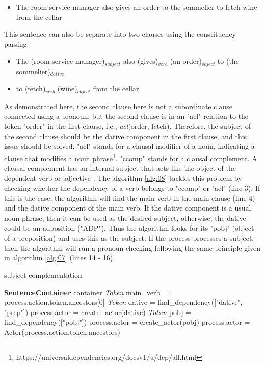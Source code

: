 \begin{itemize}
    \item The room-service manager also gives an order to the sommelier to fetch wine from the cellar
\end{itemize}

This sentence can also be separate into two clauses using the constituency parsing.

\begin{itemize}
    \item The (room-service manager)$_{subject}$ also (gives)$_{verb}$ (an order)$_{object}$ to (the sommelier)$_{dative}$ 
    \item to (fetch)$_{verb}$ (wine)$_{object}$ from the cellar
\end{itemize}

As demonstrated here, the second clause here is not a subordinate clause connected using a pronoun, but the second clause is in an "acl" relation to the token "order" in the first clause, i.e., \textit{acl}(order, fetch). Therefore, the subject of the second clause should be the dative component in the first clause, and this issue should be solved. "acl" stands for a clausal modifier of a noun, indicating a clause that modifies a noun phrase\footnote{https://universaldependencies.org/docsv1/u/dep/all.html}. "ccomp" stands for a clausal complement. A clausal complement has an internal subject that acts like the object of the dependent verb or adjective \cite{dependencies_manual}. The algorithm \ref{alg:08} tackles this problem by checking whether the dependency of a verb belongs to "ccomp" or "acl" (line 3). If this is the case, the algorithm will find the main verb in the main clause (line 4) and the dative component of the main verb. If the dative component is a usual noun phrase, then it can be used as the desired subject, otherwise, the dative could be an adposition ("ADP"). Thus the algorithm looks for its "pobj" (object of a preposition) and uses this as the subject. If the process processes a subject, then the algorithm will run a pronoun checking following the same principle given in algorithm \ref{alg:07} (lines 14 - 16).

\begin{algorithm}
\caption{subject complementation}
\label{alg:08}
	\begin{algorithmic} [1]
		\REQUIRE \textbf{SentenceContainer} container
		\STATE \textit{Token} main\_verb = process.action.token.ancestors[0]
		\STATE \textit{Token} dative = find\_dependency(["dative", "prep"])
		\STATE process.actor = create\_actor(dative)
		\STATE \textit{Token} pobj = find\_dependency(["pobj"])
		\STATE process.actor = create\_actor(pobj)
		\ENDIF
		\ENDIF
		\ELSE 
		\STATE process.actor = Actor(process.action.token.ancestors)
		\ENDIF
		\ENDIF
		\ENDFOR
	\end{algorithmic}
\end{algorithm}

